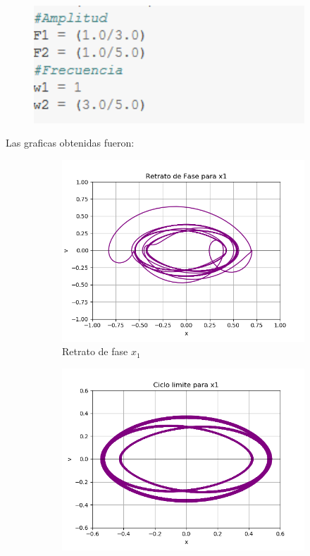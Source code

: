 \documentclass[12pt]{article}
\begin{document}
\begin{figure}[h!]
    \centering
\includegraphics[width=4in]{Cod11.png}
\end{figure}

Las graficas obtenidas fueron: \\

\begin{figure}[h!]
\begin{subfigure}{.55\textwidth}
  \centering
  \includegraphics[width=.8\linewidth]{Ej4_11.png}
  \caption{Retrato de fase $x_1$}
  \label{fig:sfig2}
\end{subfigure}
\begin{subfigure}{.55\textwidth}
  \centering
  \includegraphics[width=.8\linewidth]{Ej4_15.png}

\end{subfigure}
\end{figure}
\end{document}
